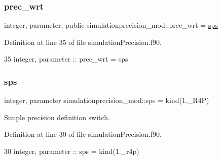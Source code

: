\subsubsection{\texorpdfstring{prec\+\_\+wrt}{prec\_wrt}}
{\footnotesize\ttfamily integer, parameter, public simulationprecision\+\_\+mod\+::prec\+\_\+wrt = \mbox{\hyperlink{namespacesimulationprecision__mod_a4e5f74805628e67a1d7b33106780b85d}{sps}}}



Definition at line 35 of file simulation\+Precision.\+f90.


\begin{DoxyCode}
35     \textcolor{keywordtype}{integer},  \textcolor{keywordtype}{parameter} :: prec\_wrt  = sps
\end{DoxyCode}
\mbox{\label{namespacesimulationprecision__mod_a4e5f74805628e67a1d7b33106780b85d}} 
\subsubsection{\texorpdfstring{sps}{sps}}
{\footnotesize\ttfamily integer, parameter simulationprecision\+\_\+mod\+::sps = kind(1.\+\_\+\+R4P)\hspace{0.3cm}{\ttfamily [private]}}



Simple precision definition switch. 



Definition at line 30 of file simulation\+Precision.\+f90.


\begin{DoxyCode}
30     \textcolor{keywordtype}{integer},  \textcolor{keywordtype}{parameter} :: sps  = kind(1.\_r4p)   
\end{DoxyCode}
